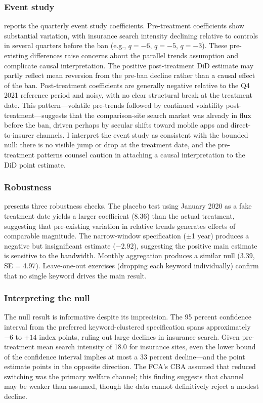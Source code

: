 \documentclass[12pt]{article}
\begin{document}
\subsubsection*{Event study}  reports the quarterly event study coefficients. Pre-treatment coefficients show substantial variation, with insurance search intensity declining relative to controls in several quarters before the ban (e.g., $q = -6$, $q = -5$, $q = -3$). These pre-existing differences raise concerns about the parallel trends assumption and complicate causal interpretation. The positive post-treatment DiD estimate may partly reflect mean reversion from the pre-ban decline rather than a causal effect of the ban. Post-treatment coefficients are generally negative relative to the Q4 2021 reference period and noisy, with no clear structural break at the treatment date. This pattern---volatile pre-trends followed by continued volatility post-treatment---suggests that the comparison-site search market was already in flux before the ban, driven perhaps by secular shifts toward mobile apps and direct-to-insurer channels. I interpret the event study as consistent with the bounded null: there is no visible jump or drop at the treatment date, and the pre-treatment patterns counsel caution in attaching a causal interpretation to the DiD point estimate.



\subsubsection*{Robustness}  presents three robustness checks. The placebo test using January 2020 as a fake treatment date yields a larger coefficient (8.36) than the actual treatment, suggesting that pre-existing variation in relative trends generates effects of comparable magnitude. The narrow-window specification ($\pm$1 year) produces a negative but insignificant estimate ($-2.92$), suggesting the positive main estimate is sensitive to the bandwidth. Monthly aggregation produces a similar null (3.39, SE = 4.97). Leave-one-out exercises (dropping each keyword individually) confirm that no single keyword drives the main result.



\subsubsection*{Interpreting the null} The null result is informative despite its imprecision. The 95 percent confidence interval from the preferred keyword-clustered specification spans approximately $-6$ to $+14$ index points, ruling out large declines in insurance search. Given pre-treatment mean search intensity of 18.0 for insurance sites, even the lower bound of the confidence interval implies at most a 33 percent decline---and the point estimate points in the opposite direction. The FCA's CBA assumed that reduced switching was the primary welfare channel; this finding suggests that channel may be weaker than assumed, though the data cannot definitively reject a modest decline.
\end{document}
